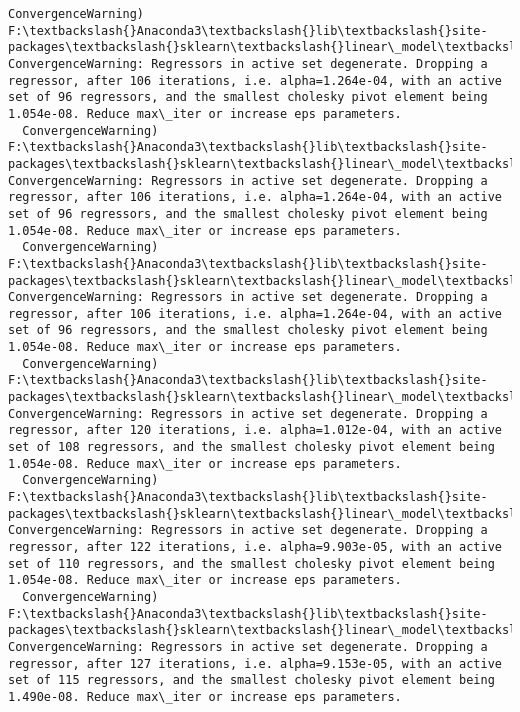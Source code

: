 \documentclass[11pt]{article}
\begin{document}
\begin{Verbatim}[commandchars=\\\{\}]
  ConvergenceWarning)
F:\textbackslash{}Anaconda3\textbackslash{}lib\textbackslash{}site-packages\textbackslash{}sklearn\textbackslash{}linear\_model\textbackslash{}least\_angle.py:313: ConvergenceWarning: Regressors in active set degenerate. Dropping a regressor, after 106 iterations, i.e. alpha=1.264e-04, with an active set of 96 regressors, and the smallest cholesky pivot element being 1.054e-08. Reduce max\_iter or increase eps parameters.
  ConvergenceWarning)
F:\textbackslash{}Anaconda3\textbackslash{}lib\textbackslash{}site-packages\textbackslash{}sklearn\textbackslash{}linear\_model\textbackslash{}least\_angle.py:313: ConvergenceWarning: Regressors in active set degenerate. Dropping a regressor, after 106 iterations, i.e. alpha=1.264e-04, with an active set of 96 regressors, and the smallest cholesky pivot element being 1.054e-08. Reduce max\_iter or increase eps parameters.
  ConvergenceWarning)
F:\textbackslash{}Anaconda3\textbackslash{}lib\textbackslash{}site-packages\textbackslash{}sklearn\textbackslash{}linear\_model\textbackslash{}least\_angle.py:313: ConvergenceWarning: Regressors in active set degenerate. Dropping a regressor, after 106 iterations, i.e. alpha=1.264e-04, with an active set of 96 regressors, and the smallest cholesky pivot element being 1.054e-08. Reduce max\_iter or increase eps parameters.
  ConvergenceWarning)
F:\textbackslash{}Anaconda3\textbackslash{}lib\textbackslash{}site-packages\textbackslash{}sklearn\textbackslash{}linear\_model\textbackslash{}least\_angle.py:313: ConvergenceWarning: Regressors in active set degenerate. Dropping a regressor, after 120 iterations, i.e. alpha=1.012e-04, with an active set of 108 regressors, and the smallest cholesky pivot element being 1.054e-08. Reduce max\_iter or increase eps parameters.
  ConvergenceWarning)
F:\textbackslash{}Anaconda3\textbackslash{}lib\textbackslash{}site-packages\textbackslash{}sklearn\textbackslash{}linear\_model\textbackslash{}least\_angle.py:313: ConvergenceWarning: Regressors in active set degenerate. Dropping a regressor, after 122 iterations, i.e. alpha=9.903e-05, with an active set of 110 regressors, and the smallest cholesky pivot element being 1.054e-08. Reduce max\_iter or increase eps parameters.
  ConvergenceWarning)
F:\textbackslash{}Anaconda3\textbackslash{}lib\textbackslash{}site-packages\textbackslash{}sklearn\textbackslash{}linear\_model\textbackslash{}least\_angle.py:313: ConvergenceWarning: Regressors in active set degenerate. Dropping a regressor, after 127 iterations, i.e. alpha=9.153e-05, with an active set of 115 regressors, and the smallest cholesky pivot element being 1.490e-08. Reduce max\_iter or increase eps parameters.

\end{Verbatim}
\end{document}
